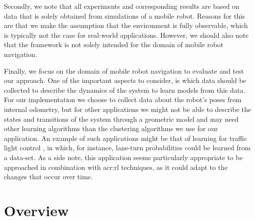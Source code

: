 Secondly, we note that all experiments and corresponding results are based on data that is solely obtained from simulations of a mobile robot.
Reasons for this are that we make the assumption that the environment is fully observable, which is typically not the case for real-world applications.
However, we should also note that the framework is not solely intended for the domain of mobile robot navigation.%

Finally, we focus on the domain of mobile robot navigation to evaluate and test our approach.
One of the important aspects to consider, is which data should be collected to describe the dynamics of the system to learn models from this data.
For our implementation we choose to collect data about the robot's poses from internal odometry, but for other applications we might not be able to describe the states and transitions of the system through a geometric model and may need other learning algorithms than the clustering algorithms we use for our application.
An example of such applications might be that of learning  for traffic light control \cite{wiering2004intelligent, delgado2011efficient}, in which, for instance, lane-turn probabilities could be learned from a data-set.
As a side note, this application seems particularly appropriate to be approached in combination with \acrshort{acr:rl} techniques, as it could adapt to the changes that occur over time.


\section{Overview}
\label{sec:introduction-overview}

